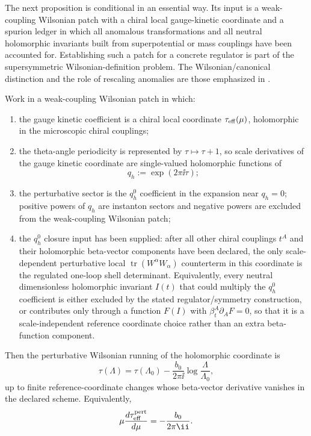 The next proposition is conditional in an essential way.  Its input is a
weak-coupling Wilsonian patch with a chiral local gauge-kinetic coordinate and
a spurion ledger in which all anomalous transformations and all neutral
holomorphic invariants built from superpotential or mass couplings have been
accounted for.  Establishing such a patch for a concrete regulator is part of
the supersymmetric Wilsonian-definition problem.  The Wilsonian/canonical
distinction and the role of rescaling anomalies are those emphasized in
\cite{ArkaniHamedMurayama1997}.

\begin{proposition}
\label{prop:holomorphic-gauge-coupling-one-loop-exact}
Work in a weak-coupling Wilsonian patch in which:
\begin{enumerate}[label=(\roman*)]
\item the gauge kinetic coefficient is a chiral local coordinate
\(\tau_{\rm eff}(\mu)\), holomorphic in the microscopic chiral couplings;
\item the theta-angle periodicity is represented by
\(\tau\mapsto\tau+1\), so scale derivatives of the gauge kinetic coordinate
are single-valued holomorphic functions of
\[
  q_h:=\exp(2\pi\ii\tau);
\]
\item the perturbative sector is the \(q_h^0\) coefficient in the expansion
near \(q_h=0\); positive powers of \(q_h\) are instanton sectors and negative
powers are excluded from the weak-coupling Wilsonian patch;
\item the \(q_h^0\) closure input has been supplied: after all other chiral
couplings \(t^A\) and their holomorphic beta-vector components have been
declared, the only scale-dependent perturbative local
\(\operatorname{tr}(W^\alpha W_\alpha)\) counterterm in this coordinate is the
regulated one-loop shell determinant.  Equivalently, every neutral
dimensionless holomorphic invariant \(I(t)\) that could multiply the \(q_h^0\)
coefficient is either excluded by the stated regulator/symmetry construction,
or contributes only through a function \(F(I)\) with
\(\beta_t^A\partial_A F=0\), so that it is a scale-independent reference
coordinate choice rather than an extra beta-function component.
\end{enumerate}
Then the perturbative Wilsonian running of the holomorphic coordinate is
\begin{equation}
  \tau(\Lambda)
  =
  \tau(\Lambda_0)
  -\frac{b_0}{2\pi\ii}\log\frac{\Lambda}{\Lambda_0},
  \label{eq:holomorphic-gauge-coordinate-one-loop-running}
\end{equation}
up to finite reference-coordinate changes whose beta-vector derivative
vanishes in the declared scheme.  Equivalently,
\[
  \mu\frac{d\tau_{\rm eff}^{\rm pert}}{d\mu}
  =
  -\frac{b_0}{2\pi\ii}.
\]
\end{proposition}

